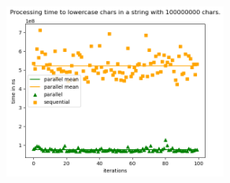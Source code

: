 \documentclass[plainarticle,zihtitle,german,final,hyperref,utf8]{zihpub}
\begin{document}
\begin{figure}[h]
	\begin{center}
		\includegraphics[width=0.65\textwidth]{images/comp_lower_100000000.png}
	\end{center}
\end{figure}

\clearpage
\end{document}
